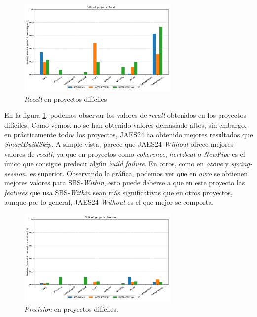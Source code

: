 \begin{figure}[H]
    \centering
    \includegraphics[width=0.7\textwidth]{images/Difficult projects: Recall.pdf}
    \caption{\textit{Recall} en proyectos difíciles}
    \label{fig:train_test_recall_difficult_projects}
\end{figure}

En la figura \ref{fig:train_test_recall_difficult_projects}, podemos observar los valores de
\textit{recall} obtenidos en los proyectos difíciles. Como vemos, no se han obtenido valores
demasiado altos, sin embargo, en prácticamente todos los proyectos, JAES24 ha obtenido
mejores resultados que \textit{SmartBuildSkip}. A simple vista, parece que JAES24-\textit{Without}
ofrece mejores valores de \textit{recall}, ya que en proyectos como \textit{coherence},
\textit{hertzbeat} o \textit{NewPipe} es el único que consigue predecir algún \textit{build
failure}. En otros, como en \textit{ozone} y \textit{spring-session}, es superior. Observando
la gráfica, podemos ver que en \textit{avro} se obtienen mejores valores para SBS-\textit{Within},
esto puede deberse a que en este proyecto las \textit{features} que usa SBS-\textit{Within} 
sean más significativas que en otros proyectos, aunque por lo general, JAES24-\textit{Without}
es el que mejor se comporta.\\

\begin{figure}[H]
    \centering
    \includegraphics[width=0.7\textwidth]{images/Difficult projects: Precision.pdf}
    \caption{\textit{Precision} en proyectos difíciles.}
    \label{fig:train_test_precision_difficult_projects}
\end{figure}

